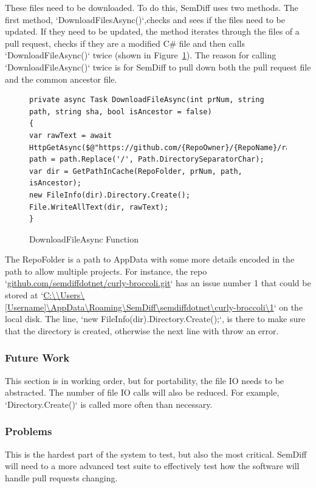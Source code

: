 \documentclass[draftclsnofoot,onecolumn]{IEEEtran}
\begin{document}
These files need to be downloaded. To do this, SemDiff uses two methods. The 
first method, `DownloadFilesAsync()`,checks and sees if the files need to be 
updated. If they need to be updated, the method iterates through the files 
of a pull request, checks if they are a modified C\# file and then calls 
`DownloadFileAsync()` twice (shown in Figure~\ref{DownloadFileAsync}). The 
reason for calling `DownloadFileAsync()` twice is for SemDiff to pull down 
both the pull request file and the common ancestor file. 

\begin{figure}[!t]
\centering
\begin{lstlisting}
private async Task DownloadFileAsync(int prNum, string path, string sha, bool isAncestor = false)
{
var rawText = await HttpGetAsync($@"https://github.com/{RepoOwner}/{RepoName}/raw/{sha}/{path}");
path = path.Replace('/', Path.DirectorySeparatorChar);
var dir = GetPathInCache(RepoFolder, prNum, path, isAncestor);
new FileInfo(dir).Directory.Create();
File.WriteAllText(dir, rawText);
}
\end{lstlisting}
\caption{DownloadFileAsync Function}
\label{DownloadFileAsync}
\end{figure}

The RepoFolder is a path to AppData with some more details encoded in the 
path to allow multiple projects. For instance, the repo 
`\url{github.com/semdiffdotnet/curly-broccoli.git}` has an issue number 1 
that could be stored at `\url{C:\\Users\[Username]\AppData\Roaming\SemDiff\semdiffdotnet\curly-broccoli\1}` 
on the local disk. The line, `new FileInfo(dir).Directory.Create();`, 
is there to make sure that the directory is created, otherwise the next line 
with throw an error.

\subsubsection{Future Work}

This section is in working order, but for portability, the file IO needs to 
be abstracted. The number of file IO calls will also be reduced. For 
example, `Directory.Create()` is called more often than necessary.

\subsubsection{Problems}

This is the hardest part of the system to test, but also the most critical. 
SemDiff will need to a more advanced test suite to effectively test how the 
software will handle pull requests changing.
\end{document}

